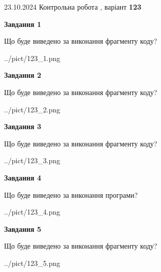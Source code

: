 \documentclass[12pt, ukrainian]{article}
\begin{document}
{\Large{23.10.2024 Контрольна робота , варіант  \No \textbf { 123 }\par}}
{
\begin {large}
{\begin {center}\textbf{Завдання 1}\end {center}}

Що буде виведено за виконання фрагменту коду?\par
\begin{center}
	{../pict/123_1.png}
\end{center}
\newpage

{\begin {center}\textbf{Завдання 2}\end {center}}

Що буде виведено за виконання фрагменту коду?\par
\begin{center}
	{../pict/123_2.png}
\end{center}
\newpage

{\begin {center}\textbf{Завдання 3}\end {center}}

Що буде виведено за виконання фрагменту коду?\par
\begin{center}
	{../pict/123_3.png}
\end{center}
\newpage

{\begin {center}\textbf{Завдання 4}\end {center}}

Що буде виведено за виконання програми?\par
\begin{center}
	{../pict/123_4.png}
\end{center}
\newpage

{\begin {center}\textbf{Завдання 5}\end {center}}

Що буде виведено за виконання фрагменту коду?\par
\begin{center}
	{../pict/123_5.png}
\end{center}
\newpage


\end{large}}
\end{document}
